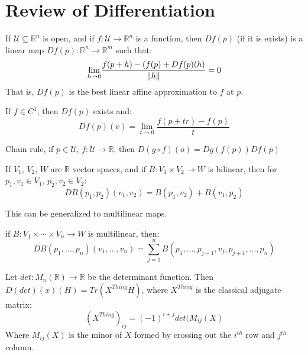 \documentclass[crop=false,class=article]{standalone}                           %
\begin{document}
    \section{Review of Differentiation}
        If $\mathcal{U}\subseteq\mathbb{R}^{n}$ is open, and if
        $f:\mathcal{U}\rightarrow\mathbb{R}^{n}$ is a function, then
        $Df(p)$ (if it is exists) is a linear map
        $Df(p):\mathbb{R}^{n}\rightarrow\mathbb{R}^{m}$ such that:
        \begin{equation}
            \underset{h\rightarrow{0}}{\lim}
                \frac{f(p+h)-(f(p)+Df(p)(h)}{\lVert h\rVert}=0
        \end{equation}
        That is, $Df(p)$ is the best linear affine approximation to $f$ at
        $p$.
        \begin{theorem}
            If $f\in{C}^{1}$, then $Df(p)$ exists and:
            \begin{equation}
                Df(p)(v)=\underset{t\rightarrow{0}}{\lim}
                \frac{f(p+tr)-f(p)}{t}
            \end{equation}
        \end{theorem}
        Chain rule, if $p\in\mathcal{U}$,
        $f:\mathcal{U}\rightarrow\mathbb{R}$,
        then $D(g\circ{f})(o)=Dg(f(p))Df(p)$
        \begin{theorem}
            If $V_{1}$, $V_{2}$, $W$ are $\mathbb{R}$ vector spaces, and
            if $B:V_{1}\times{V}_{2}\rightarrow{W}$ is bilinear, then
            for $p_{1},v_{1}\in{V}_{1}$, $p_{2},v_{2}\in{V}_{2}$:
            \begin{equation}
                DB(p_{1},p_{2})(v_{1},v_{2})=B(p_{1},v_{2})+B(v_{1},p_{2})
            \end{equation}
        \end{theorem}
        This can be generalized to multilinear maps.
        \begin{theorem}
            if $B:V_{1}\times\cdots\times{V}_{n}\rightarrow{W}$ is
            multilinear, then:
            \begin{equation}
                DB(p_{1},\dots,p_{n})(v_{1},\dots,v_{n})=
                \sum_{j=1}^{n}B(p_{1},\dots,p_{j-1},v_{j},p_{j+1},\dots,p_{n})
            \end{equation}
        \end{theorem}
        \begin{example}
            Let $det:M_{n}(\mathbb{R})\rightarrow\mathbb{R}$ be the
            determinant function. Then $D(det)(x)(H)=Tr(X^{Thing}H)$,
            where $X^{Thing}$ is the classical adjugate matrix:
            \begin{equation}
                (X^{Thing})_{ij}=(\minus{1})^{i+j}det(M_{ij}(X)
            \end{equation}
            Where $M_{ij}(X)$ is the minor of $X$ formed by crossing out the
            $i^{th}$ row and $j^{th}$ column.
        \end{example}
\end{document}
